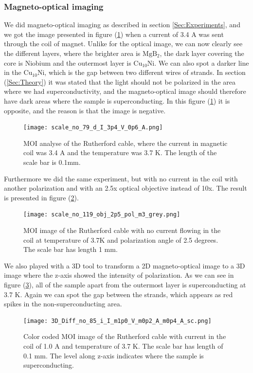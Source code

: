 \documentclass{comjnl}
\newcommand*\chem[1]{\ensuremath{\mathrm{#1}}}
\begin{document}
\subsubsection{Magneto-optical imaging}
We did magneto-optical imaging as described in section \ref{Sec:Experiments}, and we got the image presented in figure (\ref{fig:moi2d1}) when a current of 3.4 A was sent through the coil of magnet. Unlike for the optical image, we can now clearly see the different layers, where the brighter area is \chem{MgB_2}, the dark layer covering the core is Niobium and the outermost layer is \chem{Cu_{10}Ni}. We can also spot a darker line in the \chem{Cu_{10}Ni}, which is the gap between two different wires of strands. In section (\ref{Sec:Theory}) it was stated that the light should not be polarized in the area where we had superconductivity, and the magneto-optical image should therefore have dark areas where the sample is superconducting. In this figure (\ref{fig:moi2d1}) it is opposite, and the reason is that the image is negative. 
\begin{figure}[h]
\centering
\texttt{[image: scale\_no\_79\_d\_I\_3p4\_V\_0p6\_A.png]}
\caption{MOI analyse of the Rutherford cable, where the current in magnetic coil was 3.4 A and the temperature was 3.7 K. The length of the scale bar is 0.1mm. \label{fig:moi2d1}}
\end{figure}

Furthermore we did the same experiment, but with no current in the coil with another polarization and with an 2.5x optical objective instead of 10x. The result is presented in figure (\ref{fig:moi2d2}). 
\begin{figure}[h]
\centering
\texttt{[image: scale\_no\_119\_obj\_2p5\_pol\_m3\_grey.png]}
\caption{MOI image of the Rutherford cable with no current flowing in the coil at temperature of 3.7K and polarization angle of 2.5 degrees. The scale bar has length 1 mm. \label{fig:moi2d2}}
\end{figure}

We also played with a 3D tool to transform a 2D magneto-optical image to a 3D image where the z-axis showed the intensity of polarization. As we can see in figure (\ref{fig:moi3d}), all of the sample apart from the outermost layer is superconducting at 3.7 K. Again we can spot the gap between the strands, which appears as red spikes in the non-superconducting area. 
\begin{figure}[h]
\centering
\texttt{[image: 3D\_Diff\_no\_85\_i\_I\_m1p0\_V\_m0p2\_A\_m0p4\_A\_sc.png]}
\caption{Color coded MOI image of the Rutherford cable with current in the coil of 1.0 A and temperature of 3.7 K. The scale bar has length of 0.1 mm. The level along z-axis indicates where the sample is superconducting.\label{fig:moi3d}}
\end{figure}
\end{document}
